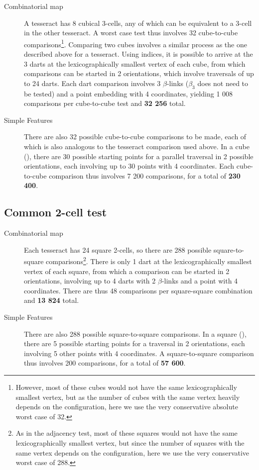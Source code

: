 \begin{description}
\item[Combinatorial map] A tesseract has 8 cubical 3-cells, any of which can be equivalent to a 3-cell in the other tesseract.
A worst case test thus involves 32 cube-to-cube comparisons\footnote{However, most of these cubes would not have the same lexicographically smallest vertex, but as the number of cubes with the same vertex heavily depends on the configuration, here we use the very conservative absolute worst case of 32.}.
Comparing two cubes involves a similar process as the one described above for a tesseract.
Using indices, it is possible to arrive at the 3 darts at the lexicographically smallest vertex of each cube, from which comparisons can be started in 2 orientations, which involve traversals of up to 24 darts.
Each dart comparison involves 3 $\beta$-links ($\beta_3$ does not need to be tested) and a point embedding with 4 coordinates, yielding 1 008 comparisons per cube-to-cube test and \textbf{32 256} total.

\item[Simple Features] There are also 32 possible cube-to-cube comparisons to be made, each of which is also analogous to the tesseract comparison used above.
In a cube (), there are 30 possible starting points for a parallel traversal in 2 possible orientations, each involving up to 30 points with 4 coordinates.
Each cube-to-cube comparison thus involves 7 200 comparisons, for a total of \textbf{230 400}.
\end{description}

\subsection*{Common 2-cell test}

\begin{description}
\item[Combinatorial map] Each tesseract has 24 square 2-cells, so there are 288 possible square-to-square comparisons\footnote{As in the adjacency test, most of these squares would not have the same lexicographically smallest vertex, but since the number of squares with the same vertex depends on the configuration, here we use the very conservative worst case of 288.}.
There is only 1 dart at the lexicographically smallest vertex of each square, from which a comparison can be started in 2 orientations, involving up to 4 darts with 2 $\beta$-links and a point with 4 coordinates.
There are thus 48 comparisons per square-square combination and \textbf{13 824} total.

\item[Simple Features] There are also 288 possible square-to-square comparisons.
In a square (), there are 5 possible starting points for a traversal in 2 orientations, each involving 5 other points with 4 coordinates.
A square-to-square comparison thus involves 200 comparisons, for a total of \textbf{57 600}.
\end{description}

